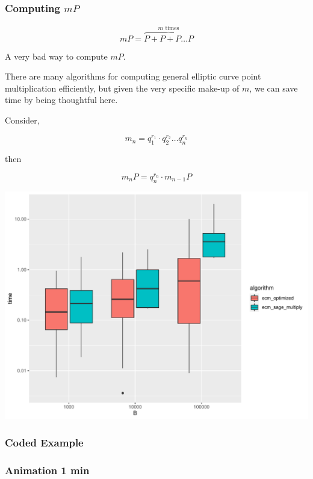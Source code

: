 \documentclass{beamer}
\begin{document}
\begin{frame}
\frametitle{Computing $mP$}

\[ mP = \overbrace{P + P + P \ldots P}^\text{$m$ times} \]
\begin{center}
    A very bad way to compute $mP$.
\end{center}

There are many algorithms for computing general elliptic curve point multiplication efficiently, but given the very specific make-up of $m$, we can save time by being thoughtful here.

Consider,

\[ m_n = q_1^{r_1} \cdot q_2^{r_2} \ldots q_n^{r_n} \]

then

\[ m_nP = q_n^{r_n} \cdot m_{n-1}P \]

\end{frame}

\begin{frame}

\includegraphics[width=\textwidth]{graphs/ecm_perf.pdf}

\end{frame}

\begin{frame}
\frametitle{Coded Example}



\end{frame}

\begin{frame}
\frametitle{Animation 1 min}

\end{frame}
\end{document}
